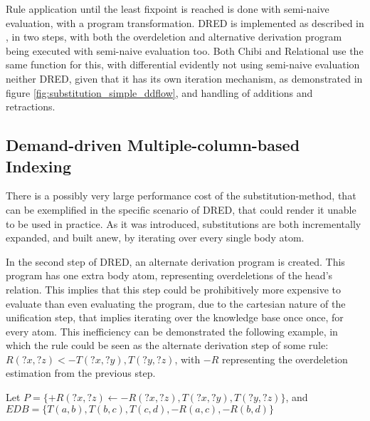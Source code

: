 \documentclass[sigconf,screen,review=false,natbib]{acmart}
\theoremstyle{definition}
\begin{document}
Rule application until the least fixpoint is reached is done with semi-naive evaluation\cite{abiteboul}, with a program
transformation. DRED is implemented as described in \cite{dred}, in two steps, with both the overdeletion and alternative
derivation program being executed with semi-naive evaluation too. Both Chibi and Relational use the same function for this,
with differential evidently not using semi-naive evaluation neither DRED, given that it has its own iteration mechanism, as
demonstrated in figure \ref{fig:substitution_simple_ddflow}, and handling of additions and retractions.

\subsection{Demand-driven Multiple-column-based Indexing}
There is a possibly very large performance cost of the substitution-method, that can be exemplified in the specific scenario
of DRED, that could render it unable to be used in practice. As it was introduced, substitutions are both incrementally expanded,
and built anew, by iterating over every single body atom.

In the second step of DRED, an alternate derivation program is created. This program has one extra body atom, representing
overdeletions of the head's relation. This implies that this step could be prohibitively more expensive to evaluate than even
evaluating the program, due to the cartesian nature of the unification step, that implies iterating over the knowledge base once
once, for every atom. This inefficiency can be demonstrated the following example, in which the rule could be seen as the
alternate derivation step of some rule: $R(?x, ?z) <- T(?x, ?y), T(?y, ?z)$, with $-R$ representing the overdeletion estimation
from the previous step.

Let $P = \{+R(?x, ?z) \leftarrow -R(?x, ?z), T(?x, ?y), T(?y, ?z)\}$, and $EDB = \{T(a, b), T(b, c), T(c, d), -R(a, c), -R(b, d)\}$
\end{document}
